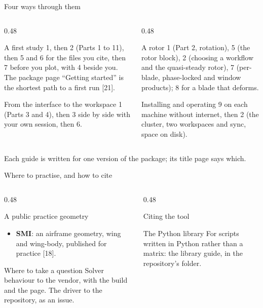 \begin{frame}{Four ways through them}
\begin{columns}[T]
\begin{column}{0.48\textwidth}
\begin{block}{A first study}
\small 1, then 2 (Parts 1 to 11), then 5 and 6 for the files you cite, then 7
before you plot, with 4 beside you. The package page ``Getting started'' is the shortest path to
a first run [21].
\end{block}
\begin{block}{From the interface to the workspace}
\small 1 (Parts 3 and 4), then 3 side by side with your own session, then 6.
\end{block}
\end{column}
\begin{column}{0.48\textwidth}
\begin{block}{A rotor}
\small 1 (Part 2, rotation), 5 (the rotor block), 2 (choosing a workflow and
the quasi-steady rotor), 7 (per-blade, phase-locked and window products); 8
for a blade that deforms.
\end{block}
\begin{block}{Installing and operating}
\small 9 on each machine without internet, then 2 (the cluster, two
workspaces and sync, space on disk).
\end{block}
\end{column}
\end{columns}
\begin{takeaway}Each guide is written for one version of the package; its
title page says which.\end{takeaway}
\end{frame}

\begin{frame}{Where to practise, and how to cite}
\begin{columns}[T]
\begin{column}{0.48\textwidth}
\begin{block}{A public practice geometry}
\begin{itemize}\small
  \item \textbf{SMI}: an airframe geometry, wing and wing-body, published
        for practice [18].
\end{itemize}
\end{block}
\begin{block}{Where to take a question}
\small Solver behaviour to the vendor, with the build and the page. The
driver to the repository, as an issue.
\end{block}
\end{column}
\begin{column}{0.48\textwidth}
\begin{block}{Citing the tool}
\small \pkgcitation
\end{block}
\begin{block}{The Python library}
\small For scripts written in Python rather than a matrix: the library
guide,  in the repository's
 folder.
\end{block}
\end{column}
\end{columns}
\end{frame}
